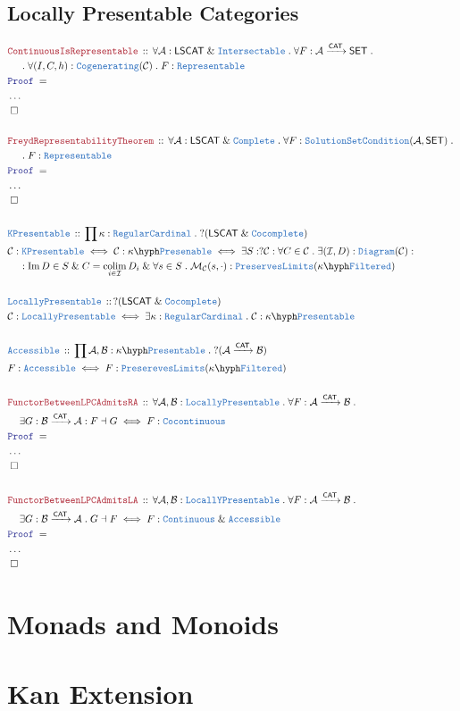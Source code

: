 \documentclass[12pt]{scrartcl}
\newcommand{\TYPE}[1]{\textcolor{NavyBlue}{\mathtt{#1}}}
\newcommand{\LOGIC}[1]{\textcolor{Blue}{\mathtt{#1}}}
\newcommand{\THM}[1]{\textcolor{Maroon}{\mathtt{#1}}}
\renewcommand{\.}{\; . \;}
\newcommand{\Theorem}[2]{& \THM{#1} \, :: \, #2 \\ & \Proof = \\ }
\newcommand{\DeclareType}[2]{& \TYPE{#1} \, :: \, #2 \\}
\newcommand{\DefineType}[3]{& #1 : \TYPE{#2} \iff #3 \\}
\newcommand{\DefineNamedType}[4]{& #1 : \TYPE{#2} \iff #3 \iff #4 \\}
\newcommand{\NewLine}{\\ & \kern 1pc}
\newcommand{\Page}[1]{ \begin{align*} #1 \end{align*}   }
\newcommand{\NoProof}{ & \ldots \\ \EndProof}
\renewcommand{\And}{\; \& \;}
\DeclareMathOperator*{\im}{Im}
\newcommand{\Mor}{\mathcal{M}}
\newcommand{\Arrow}{\xrightarrow}
\newcommand{\QED}{\; \square}
\newcommand{\EndProof}{& \QED \\}
\newcommand{\Proof}{\LOGIC{Proof} \; }
\DeclareMathOperator*{\colim}{colim}
\newcommand{\C}{\mathcal{C}}
\newcommand{\A}{\mathcal{A}}
\newcommand{\B}{\mathcal{B}}
\newcommand{\I}{\mathcal{I}}
\newcommand{\CAT}{\mathsf{CAT}}
\newcommand{\SET}{\mathsf{SET}}
\begin{document}
\subsection{Locally Presentable Categories}
\Page{
	\Theorem{ContinuousIsRepresentable}
	{
		\forall \A : \mathsf{LSCAT} \And \TYPE{Intersectable} \.
		\forall F : \A \Arrow{\CAT} \SET \.
		\NewLine \.
		\forall (I,C,h) : \TYPE{Cogenerating}(\C) \.
		F : \TYPE{Representable}
	}
	\NoProof
	\\
	\Theorem{FreydRepresentabilityTheorem}
	{
		\forall \A : \mathsf{LSCAT} \And \TYPE{Complete} \.
		\forall F  : \TYPE{SolutionSetCondition}(\A,\SET) \. \NewLine \. 
		F : \TYPE{Representable}
	}
	\NoProof
	\\
	\DeclareType{KPresentable}{\prod \kappa : \TYPE{RegularCardinal} \.  ?(\mathsf{LSCAT} \And \TYPE{Cocomplete})}
	\DefineNamedType{\C}{KPresentable}{ \C : \kappa\hyph\TYPE{Presenable} }{
		 \exists S : ?\C : 
		 \forall C \in \C \.  
		 \exists (\I,D) : \TYPE{Diagram}(\C) : \NewLine : 
		 \im D \in S \And 
		 C = \colim_{i \in \I} D_i \And 
		 \forall  s \in S \.  
		 \Mor_\C(s,\cdot) : \TYPE{PreservesLimits}(\kappa\hyph\TYPE{Filtered})
	}
	\\
      \DeclareType{LocallyPresentable}{?(\mathsf{LSCAT} \And \TYPE{Cocomplete})}
      \DefineType{\C}{LocallyPresentable}{\exists \kappa : \TYPE{RegularCardinal} \. \C : \kappa\hyph\TYPE{Presentable}}
      \\
      \DeclareType{Accessible}{ \prod \A,\B : \kappa\hyph\TYPE{Presentable} \. ?(\A \Arrow{\CAT} \B)}
      \DefineType{F}{Accessible}{ F : \TYPE{PreserevesLimits}(\kappa\hyph \TYPE{Filtered})}
      \\
      \Theorem{FunctorBetweenLPCAdmitsRA}{ 
      		\forall \A, \B : \TYPE{LocallyPresentable} \.
		\forall F : \A \Arrow{\CAT} \B \. \NewLine
			\exists G : \B \Arrow{\CAT} \A :
			F \dashv G
		\iff
			F : \TYPE{Cocontinuous}
	}
     \NoProof
     \\
     \Theorem{FunctorBetweenLPCAdmitsLA}{
		\forall \A,\B : \TYPE{LocallYPresentable} \.
		\forall F : \A \Arrow{\CAT} \B \. \NewLine
			\exists G : \B \Arrow{\CAT} \A \. 
			G \dashv F
		\iff
			F : \TYPE{Continuous} \And \TYPE{Accessible}
     }
     \NoProof
}
\newpage
\section{Monads and Monoids}
\section{Kan Extension}
\end{document}

